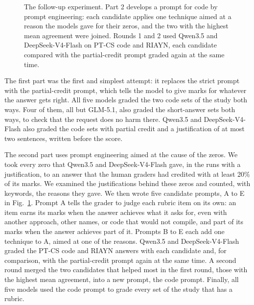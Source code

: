 \begin{figure}[!htb]
\caption{The follow-up experiment. Part 2 develops a prompt for code by prompt engineering: each candidate applies one
technique aimed at a reason the models gave for their zeros, and the two with the highest mean agreement were
joined. Rounds 1 and 2 used Qwen3.5 and DeepSeek-V4-Flash on PT-CS code and RIAYN, each candidate compared with the
partial-credit prompt graded again at the same time.}
\label{fig:promptexp}
\end{figure}

The first part was the first and simplest attempt: it replaces the strict prompt with the partial-credit
prompt, which tells the model to give marks for whatever the answer gets right. All five models graded the two
code sets of the study both ways. Four of them, all but GLM-5.1, also graded the short-answer sets both ways,
to check that the request does no harm there. Qwen3.5 and DeepSeek-V4-Flash also graded the code sets with partial
credit and a justification of at most two sentences, written before the score.

The second part uses prompt engineering aimed at the cause of the zeros. We took every zero that Qwen3.5 and
DeepSeek-V4-Flash gave, in the runs with a justification, to an answer that the human graders had credited with at
least 20\% of its marks. We examined the justifications behind these zeros and counted, with keywords, the reasons they gave. We then wrote five candidate prompts, A to E in
Fig.~\ref{fig:promptexp}. Prompt A tells the grader to judge each rubric item on its own: an item earns its marks
when the answer achieves what it asks for, even with another approach, other names, or code that would not
compile, and part of its marks when the answer achieves part of it. Prompts B to E each add one technique to A,
aimed at one of the reasons. Qwen3.5 and DeepSeek-V4-Flash graded the PT-CS code and RIAYN answers with each
candidate and, for comparison, with the partial-credit prompt again at the same time. A second round merged the two
candidates that helped most in the first round, those with the highest mean agreement, into a new prompt, the
code prompt. Finally, all five models used the code prompt to grade every set of the study that has a rubric.

